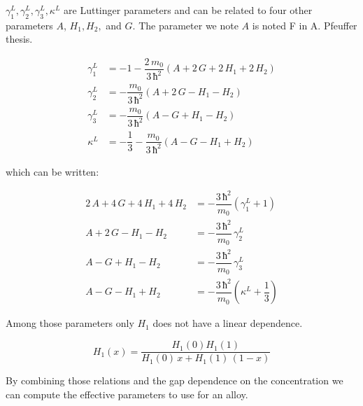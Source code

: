\documentclass[prb,aps]{revtex4}
\begin{document}
        $γ_1^L, γ_2^L, γ_3^L, κ^L$ are Luttinger parameters and can be related to four other parameters $A$, $H_1, H_2,$ and $G$. The parameter we note $A$ is noted F in A. Pfeuffer thesis.

        \begin{align}
            γ_1^L &= - 1 - \dfrac{2\,m_0}{3\,ħ^2}\left(A + 2\,G + 2\,H_1 + 2\,H_2 \right)\\
            γ_2^L &= - \dfrac{m_0}{3\,ħ^2}\left( A + 2\,G - H_1 - H_2 \right)\\
            γ_3^L &= - \dfrac{m_0}{3\,ħ^2}\left( A - G + H_1 - H_2 \right)\\
            κ^L &= - \dfrac{1}{3} - \dfrac{m_0}{3\,ħ^2}\left( A - G - H_1 + H_2 \right)
        \end{align}

        which can be written:

        \begin{align}
            2\,A + 4\,G + 4\,H_1 + 4\,H_2 &= -\dfrac{3\,ħ^2}{m_0} \left( γ_1^L + 1 \right)\\
            A + 2\,G - H_1 - H_2 &= - \dfrac{3\,ħ^2}{m_0}\,γ_2^L\\
            A - G + H_1 - H_2 &= - \dfrac{3\,ħ^2}{m_0}\,γ_3^L\\
            A - G - H_1 + H_2 &= - \dfrac{3\,ħ^2}{m_0}\left( κ^L + \dfrac{1}{3} \right)
        \end{align}

        Among those parameters only $H_1$ does not have a linear dependence.

        \begin{equation}
            H_1(x) = \dfrac{H_1(0)H_1(1)}{H_1(0)\,x + H_1(1)\,(1-x)}
        \end{equation}

        By combining those relations and the gap dependence on the concentration we can compute the effective parameters to use for an alloy.
\end{document}
